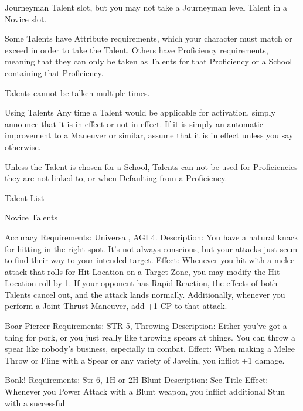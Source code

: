 \documentclass[oneside,11pt,english]{book}
\begin{document}
Journeyman Talent slot, but you may not take a Journeyman level Talent in a Novice slot. 

 

Some Talents have Attribute requirements, which your character must match or exceed in order to take 
the Talent. Others have Proficiency requirements, meaning that they can only be taken as Talents for that 
Proficiency or a School containing that Proficiency. 

 

Talents cannot be talken multiple times. 

 

Using Talents 
Any time a Talent would be applicable for activation, simply announce that it is in effect or not in effect. 
If it is simply an automatic improvement to a Maneuver or similar, assume that it is in effect unless you 
say otherwise. 

 

Unless the Talent is chosen for a School, Talents can not be used for Proficiencies they are not linked to, 
or when Defaulting from a Proficiency. 

 

Talent List 

 

Novice Talents 

 

Accuracy 
Requirements: Universal, AGI 4. 
Description: You have a natural knack for hitting in the right spot. It's not always conscious, but your 
attacks just seem to find their way to your intended target. 
Effect: Whenever you hit with a melee attack that rolls for Hit Location on a Target Zone, you may 
modify the Hit Location roll by 1. If your opponent has Rapid Reaction, the effects of both Talents cancel 
out, and the attack lands normally. 
Additionally, whenever you perform a Joint Thrust Maneuver, add +1 CP to that attack. 

 

Boar Piercer 
Requirements: STR 5, Throwing 
Description: Either you’ve got a thing for pork, or you just really like throwing spears at things. You can 
throw a spear like nobody’s business, especially in combat. 
Effect: When making a Melee Throw or Fling with a Spear or any variety of Javelin, you inflict +1 
damage. 

 

Bonk! 
Requirements: Str 6, 1H or 2H Blunt 
Description: See Title 
Effect: Whenever you Power Attack with a Blunt weapon, you inflict additional Stun with a successful 
\end{document}
